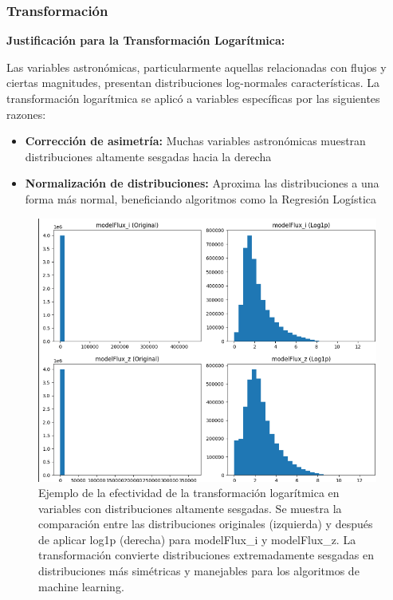 \documentclass{article}
\begin{document}
\subsubsection{Transformación}

\textbf{Justificación para la Transformación Logarítmica:}

Las variables astronómicas, particularmente aquellas relacionadas con flujos y ciertas magnitudes, presentan distribuciones log-normales características. La transformación logarítmica se aplicó a variables específicas por las siguientes razones:

\begin{itemize}
    \item \textbf{Corrección de asimetría:} Muchas variables astronómicas muestran distribuciones altamente sesgadas hacia la derecha
    \item \textbf{Normalización de distribuciones:} Aproxima las distribuciones a una forma más normal, beneficiando algoritmos como la Regresión Logística
\end{itemize}

\begin{figure}[H]
    \centering
    \includegraphics[width=0.8\linewidth]{logaritmica_ejemplo.png}
    \caption{Ejemplo de la efectividad de la transformación logarítmica en variables con distribuciones altamente sesgadas. Se muestra la comparación entre las distribuciones originales (izquierda) y después de aplicar log1p (derecha) para modelFlux\_i y modelFlux\_z. La transformación convierte distribuciones extremadamente sesgadas en distribuciones más simétricas y manejables para los algoritmos de machine learning.}
    \label{fig:transformacion_logaritmica}
\end{figure}
\end{document}

